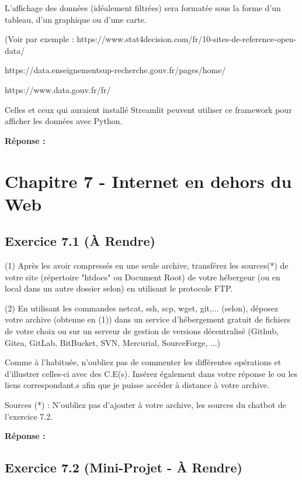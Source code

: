 \documentclass[11pt]{article}
\begin{document}
L’affichage des données (idéalement filtrées) sera formatée sous la forme d’un tableau, d’un graphique ou d’une carte.

(Voir par exemple : https://www.stat4decision.com/fr/10-sites-de-reference-open-data/

https://data.enseignementsup-recherche.gouv.fr/pages/home/

https://www.data.gouv.fr/fr/

Celles et ceux qui auraient installé Streamlit peuvent utiliser ce framework pour afficher les données avec Python.

\textbf{Réponse :}


\section*{Chapitre 7 - Internet en dehors du Web}

	\subsection*{Exercice 7.1 (À Rendre)}
	
(1) Après les avoir compressés en une seule archive, transférez les sources(*) de votre site (répertoire "htdocs" ou Document Root) de votre hébergeur (ou en local dans un autre dossier selon) en utilisant le protocole FTP.

(2) En utilisant les commandes netcat, ssh, scp, wget, git,... (selon), déposez votre archive (obtenue en (1)) dans un service d’hébergement gratuit de fichiers de votre choix ou sur un serveur de gestion de versions décentralisé (Github, Gitea, GitLab, BitBucket, SVN, Mercurial, SourceForge, ...)

Comme à l’habituée, n’oubliez pas de commenter les différentes opérations et d’illustrer celles-ci avec des C.E(s). Insérez également dans votre réponse le ou les liens correspondant.s afin que je puisse accéder à distance à votre archive.

Sources (*) : N’oubliez pas d’ajouter à votre archive, les sources du chatbot de l’exercice 7.2.

\textbf{Réponse :}


	\subsection*{Exercice 7.2 (Mini-Projet - À Rendre)}
	
\end{document}
